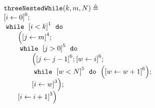 \begin{example}
    \label{ex:threeNestedWhile}
    \[
    \begin{array}{l}
        \kw{threeNestedWhile}(k, m, N) \triangleq \\
        \clabel{ \assign{i}{0} }^{0} ; \\
            \ewhile ~ \clabel{i < k}^{1} ~ \edo ~ \\
            \qquad \Big(
             \clabel{\assign{j}{m}}^{4} ;\\
             \qquad \ewhile ~ \clabel{j > 0}^{5} ~ \edo ~ \\
             \qquad \qquad \Big(
              \clabel{\assign{j}{j-1}}^{6};
              \clabel{\assign{w}{i}}^{6};\\
              \qquad \qquad \ewhile ~ \clabel{w < N}^{5} ~ \edo ~
              \Big(
                \clabel{\assign{w}{w + 1}}^{6}
                  \Big); \\
                  \qquad \qquad \clabel{\assign{i}{w}}^{3}
                  \Big); \\
                  \qquad \clabel{\assign{i}{i+1}}^{3}
              \Big)
        \end{array}
    \]
\end{example}

